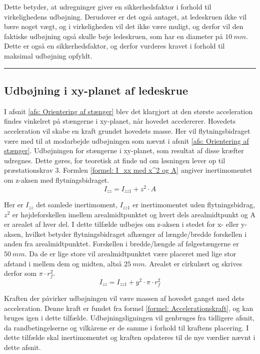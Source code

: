 Dette betyder, at udregninger giver en sikkerhedsfaktor i forhold til virkelighedens udbøjning. Derudover er det også antaget, at ledeskruen ikke vil bære noget vægt, og i virkeligheden vil det ikke være muligt, og derfor vil den faktiske udbøjning også skulle bøje ledeskruen, som har en diameter på $\SI{10}{mm}$. Dette er også en sikkerhedsfaktor, og derfor vurderes kravet i forhold til maksimal udbøjning opfyldt.


\plainbreak{2}
\subsection{Udbøjning i xy-planet af ledeskrue}
I afsnit \ref{afs: Orientering af stænger} blev det klargjort at den største acceleration findes vinkelret på stængerne i xy-planet, når hovedet accelererer. Hovedets acceleration vil skabe en kraft grundet hovedets masse. Her vil flytningsbidraget være med til at modarbejde udbøjningen som nævnt i afsnit \ref{afs: Orientering af stænger}. Udbøjningen for stængerne i xy-planet, som resultat af disse kræfter udregnes. Dette gøres, for teoretisk at finde ud om løsningen lever op til præstationskrav 3. Formlen \ref{formel: I_xx med x^2 og A} angiver inertimomentet om z-aksen med flytningsbidraget. 
\begin{equation} \label{formel: I_xx med x^2 og A}
    I_{zz}=I_{zz1}+z^2\cdot A
\end{equation}

Her er $I_{zz}$ det samlede inertimoment, $I_{zz1}$ er inertimomentet uden flytningsbidrag, $z^2$ er højdeforskellen imellem arealmidtpunktet og hvert dels arealmidtpunkt og A er arealet af hver del. I dette tilfælde udbøjes om z-aksen i stedet for x- eller y-aksen, hvilket betyder flytningsbidraget afhænger af længde/bredde forskellen i anden fra arealmidtpunktet. Forskellen i bredde/længde af følgestængerne er \(\SI{50}{mm}\). Da de er lige store vil arealmidtpunktet være placeret med lige stor afstand i mellem dem og midten, altså \(\SI{25}{mm}\). Arealet er cirkulært og skrives derfor som $\pi \cdot r_f^2$.
\begin{equation}
    I_{zz}=I_{zz1}+y^2\cdot \pi\cdot r^2_f
\end{equation}

Kraften der påvirker udbøjningen vil være massen af hovedet ganget med dets acceleration. Denne kraft er fundet fra formel \ref{formel: Accelerationskraft}, og kan bruges igen i dette tilfælde. Udbøjningsligningen vil genbruges fra tidligere afsnit, da randbetingelserne og vilkårene er de samme i forhold til kraftens placering. I dette tilfælde skal inertimomentet og kraften opdateres til de nye værdier nævnt i dette afsnit.





